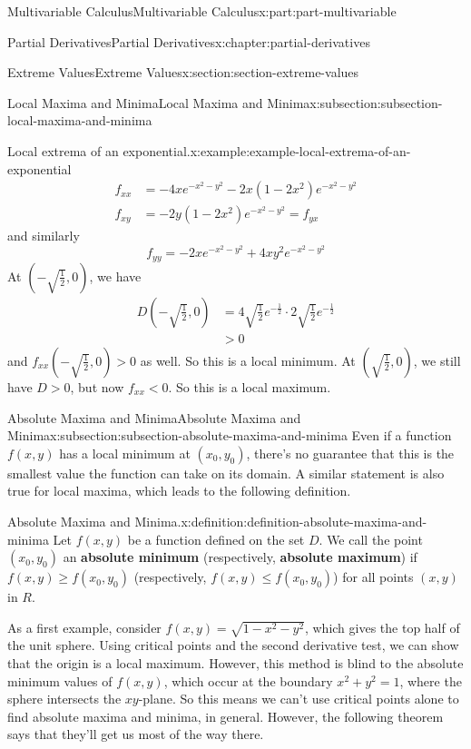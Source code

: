 \documentclass[twoside,10pt,]{book}
\newcommand{\terminology}[1]{\textbf{#1}}
\numberwithin{equation}{part}
\begin{document}
\begin{partptx}{Multivariable Calculus}{}{Multivariable Calculus}{}{}{x:part:part-multivariable}
\begin{chapterptx}{Partial Derivatives}{}{Partial Derivatives}{}{}{x:chapter:partial-derivatives}
\begin{sectionptx}{Extreme Values}{}{Extreme Values}{}{}{x:section:section-extreme-values}
\begin{subsectionptx}{Local Maxima and Minima}{}{Local Maxima and Minima}{}{}{x:subsection:subsection-local-maxima-and-minima}
\begin{example}{Local extrema of an exponential.}{x:example:example-local-extrema-of-an-exponential}
\begin{align*}
f_{xx} & = -4xe^{-x^{2} - y^{2}} - 2x(1 - 2x^{2})e^{-x^{2} - y^{2}} \\
f_{xy} & = -2y(1-2x^{2})e^{-x^{2} - y^{2}} = f_{yx} 
\end{align*}
and similarly%
\begin{equation*}
f_{yy} = -2xe^{-x^{2} - y^{2}} + 4xy^{2}e^{-x^{2} - y^{2}}
\end{equation*}
At \((-\sqrt{\frac{1}{2}},0)\), we have%
\begin{align*}
D\left(-\sqrt{\frac{1}{2}},0\right) & = 4\sqrt{\frac{1}{2}}e^{-\frac{1}{2}}\cdot2\sqrt{\frac{1}{2}}e^{-\frac{1}{2}}\\
& > 0 
\end{align*}
and \(f_{xx}(-\sqrt{\frac{1}{2}},0) >0\) as well. So this is a local minimum. At \((\sqrt{\frac{1}{2}},0)\), we still have \(D>0\), but now \(f_{xx}<0\). So this is a local maximum.%
\end{example}
\end{subsectionptx}
%
%
\typeout{************************************************}
\typeout{************************************************}
%
\begin{subsectionptx}{Absolute Maxima and Minima}{}{Absolute Maxima and Minima}{}{}{x:subsection:subsection-absolute-maxima-and-minima}
Even if a function \(f(x,y)\) has a local minimum at \((x_{0},y_{0})\), there's no guarantee that this is the smallest value the function can take on its domain. A similar statement is also true for local maxima, which leads to the following definition.%
\begin{definition}{Absolute Maxima and Minima.}{x:definition:definition-absolute-maxima-and-minima}%
%
Let \(f(x,y)\) be a function defined on the set \(D\). We call the point \((x_{0},y_{0})\) an \terminology{absolute minimum} (respectively, \terminology{absolute maximum}) if \(f(x,y)\geq f(x_{0},y_{0})\) (respectively, \(f(x,y)\leq f(x_{0},y_{0})\)) for all points \((x,y)\) in \(R\).%
\end{definition}
As a first example, consider \(f(x,y) = \sqrt{1 - x^{2} - y^{2}}\), which gives the top half of the unit sphere. Using critical points and the second derivative test, we can show that the origin is a local maximum. However, this method is blind to the absolute minimum values of \(f(x,y)\), which occur at the boundary \(x^{2} + y^{2} = 1\), where the sphere intersects the \(xy\)-plane. So this means we can't use critical points alone to find absolute maxima and minima, in general. However, the following theorem says that they'll get us most of the way there.%

\end{subsectionptx}
\end{sectionptx}
\end{chapterptx}
\end{partptx}
\end{document}
